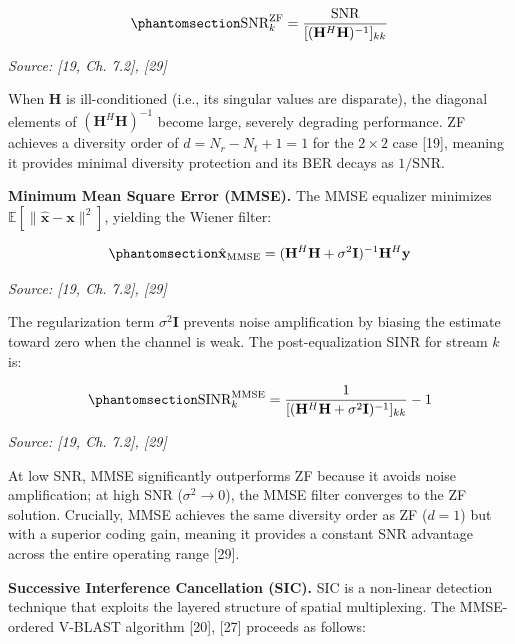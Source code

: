 \begin{equation}\protect\phantomsection\label{eq:zf-snr}{\text{SNR}_k^{\text{ZF}} = \frac{\text{SNR}}{[(\mathbf{H}^H\mathbf{H})^{-1}]_{kk}}
}\end{equation} \par{\small\textit{Source: [19, Ch. 7.2], [29]}}

When \(\mathbf{H}\) is ill-conditioned (i.e., its singular values are disparate), the diagonal elements of \((\mathbf{H}^H\mathbf{H})^{-1}\) become large, severely degrading performance. ZF achieves a diversity order of \(d = N_r - N_t + 1 = 1\) for the \(2 \times 2\) case {[}19{]}, meaning it provides minimal diversity protection and its BER decays as \(1/\text{SNR}\).

\textbf{Minimum Mean Square Error (MMSE).} The MMSE equalizer minimizes \(\mathbb{E}[\|\hat{\mathbf{x}} - \mathbf{x}\|^2]\), yielding the Wiener filter:

\begin{equation}\protect\phantomsection\label{eq:mmse-equalizer}{\hat{\mathbf{x}}_{\text{MMSE}} = (\mathbf{H}^H\mathbf{H} + \sigma^2\mathbf{I})^{-1}\mathbf{H}^H\mathbf{y}
}\end{equation} \par{\small\textit{Source: [19, Ch. 7.2], [29]}}

The regularization term \(\sigma^2\mathbf{I}\) prevents noise amplification by biasing the estimate toward zero when the channel is weak. The post-equalization SINR for stream \(k\) is:

\begin{equation}\protect\phantomsection\label{eq:mmse-sinr}{\text{SINR}_k^{\text{MMSE}} = \frac{1}{[(\mathbf{H}^H\mathbf{H} + \sigma^2\mathbf{I})^{-1}]_{kk}} - 1
}\end{equation} \par{\small\textit{Source: [19, Ch. 7.2], [29]}}

At low SNR, MMSE significantly outperforms ZF because it avoids noise amplification; at high SNR (\(\sigma^2 \to 0\)), the MMSE filter converges to the ZF solution. Crucially, MMSE achieves the same diversity order as ZF (\(d = 1\)) but with a superior coding gain, meaning it provides a constant SNR advantage across the entire operating range {[}29{]}.

\textbf{Successive Interference Cancellation (SIC).} SIC is a non-linear detection technique that exploits the layered structure of spatial multiplexing. The MMSE-ordered V-BLAST algorithm {[}20{]}, {[}27{]} proceeds as follows:

